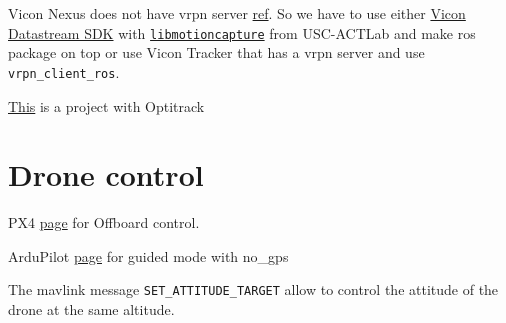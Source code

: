 Vicon Nexus does not have vrpn server \href{https://forum.worldviz.com/printthread.php?s=aff0c689c7c7ff36a324fa2335838db4&t=4273}{ref}. So we have to use either \href{https://www.vicon.com/downloads/utilities-and-sdk/datastream-sdk}{Vicon Datastream SDK} with \href{https://github.com/USC-ACTLab/libmotioncapture}{\texttt{libmotioncapture}} from USC-ACTLab and make ros package on top or use Vicon Tracker that has a vrpn server and use \texttt{vrpn\_client\_ros}.

\href{http://ardupilot.org/copter/docs/common-optitrack.html#common-optitrack}{This} is a project with Optitrack

\section{Drone control}
PX4 \href{https://discuss.ardupilot.org/t/offboard-control/37869}{page} for Offboard control.

ArduPilot \href{http://ardupilot.org/copter/docs/ac2_guidedmode.html#guided-nogps}{page} for guided mode with no\_gps

The mavlink message \texttt{SET\_ATTITUDE\_TARGET} allow to control the attitude of the drone at the same altitude.
